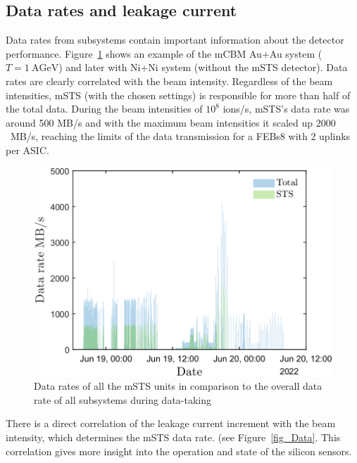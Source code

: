 \subsection{Data rates and leakage current}
Data rates from subsystems contain important information about the detector performance. Figure~\ref{fig_data_rates_Ag} shows an example of the \gls{mCBM} Au+Au system ($T= 1~\mathrm{AGeV}$) and later with Ni+Ni system (without the \gls{mSTS} detector). Data rates are clearly correlated with the beam intensity. Regardless of the beam intensities, \gls{mSTS} (with the chosen settings) is responsible for more than half of the total data. During the beam intensities of $10^{8}$ ions/s, \gls{mSTS}'s data rate was around 500 MB/s and with the maximum beam intensities it scaled up $2000$~MB/s, reaching the limits of the data transmission for a \glspl{FEB}8 with 2 uplinks per \gls{ASIC}. 
\begin{figure}[H]
\centering
\includegraphics[width=0.6\columnwidth]{Chapter6/DCS/images/rates/Ag_total.png}
\caption{Data rates of all the \gls{mSTS} units in comparison to the overall data rate of all subsystems during data-taking}
\label{fig_data_rates_Ag}
\end{figure}
There is a direct correlation of the leakage current increment with the beam intensity, which determines the \gls{mSTS} data rate. (see Figure~\ref{fig_Data}. This correlation gives more insight into the operation and state of the silicon sensors.
